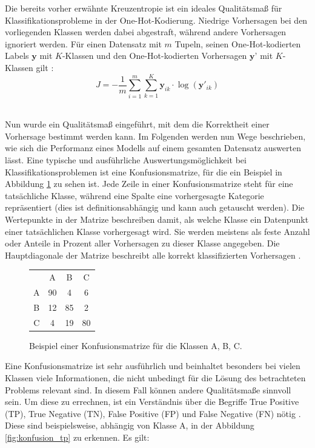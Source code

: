 \documentclass[11pt,bibliography=totocnumbered]{scrartcl}
\newcommand{\myequations}[1]{%
\addcontentsline{equ}{myequations}{\protect\numberline{\theequation}#1}}
\begin{document}
Die bereits vorher erwähnte Kreuzentropie ist ein ideales Qualitätsmaß für Klassifikationsprobleme in der One-Hot-Kodierung. Niedrige Vorhersagen bei den vorliegenden Klassen werden dabei abgestraft, während andere Vorhersagen ignoriert werden. Für einen Datensatz mit \ensuremath{m} Tupeln, seinen One-Hot-kodierten Labels \ensuremath{\textbf{y}} mit \ensuremath{K}-Klassen und den One-Hot-kodierten Vorhersagen \ensuremath{\textbf{y'}} mit \ensuremath{K}-Klassen gilt \cite[S.13]{BA}\cite[S.63]{MACHINE_LEARNING}:
\begin{equation}
\label{eq:crossentropy}
J = -\frac{1}{m}\sum_{i=1}^{m}\sum_{k=1}^{K}\textbf{y}_{ik} \cdot \log({\textbf{y}'_{ik}})
\end{equation}\myequations{Kreuzentropie}
\\
Nun wurde ein Qualitätsmaß eingeführt, mit dem die Korrektheit einer Vorhersage bestimmt werden kann. Im Folgenden werden nun Wege beschrieben, wie sich die Performanz eines Modells auf einem gesamten Datensatz auswerten lässt. Eine typische und ausführliche Auswertungsmöglichkeit bei Klassifikationsproblemen ist eine Konfusionsmatrize, für die ein Beispiel in Abbildung \ref{fig:konfusion} zu sehen ist. Jede Zeile in einer Konfusionsmatrize steht für eine tatsächliche Klasse, während eine Spalte eine vorhergesagte Kategorie repräsentiert (dies ist definitionsabhängig und kann auch getauscht werden). Die Wertepunkte in der Matrize beschreiben damit, als welche Klasse ein Datenpunkt einer tatsächlichen Klasse vorhergesagt wird. Sie werden meistens als feste Anzahl oder Anteile in Prozent aller Vorhersagen zu dieser Klasse angegeben. Die Hauptdiagonale der Matrize beschreibt alle korrekt klassifizierten Vorhersagen \cite[S.86-87]{MACHINE_LEARNING}.
\begin{figure}[H]
	\begin{center}
		\begin{tabular}{|c||c|c|c|}
			\hline
			 & A & B & C\\
			\hhline{|=||=|=|=|}
			A & 90 & 4 & 6\\
			\hline
			B & 12 & 85 & 2\\
			\hline	
			C & 4 & 19 & 80\\
			\hline
		\end{tabular}
	\end{center}
	\caption[Beispiel einer Konfusionsmatrize]{Beispiel einer Konfusionsmatrize für die Klassen A, B, C.}
	\label{fig:konfusion}
\end{figure}
Eine Konfusionsmatrize ist sehr ausführlich und beinhaltet besonders bei vielen Klassen viele Informationen, die nicht unbedingt für die Lösung des betrachteten Problems relevant sind. In diesem Fall können andere Qualitätsmaße sinnvoll sein. Um diese zu errechnen, ist ein Verständnis über die Begriffe True Positive (TP), True Negative (TN), False Positive (FP) und False Negative (FN) nötig \cite[S.87]{MACHINE_LEARNING}. Diese sind beispielsweise, abhängig von Klasse A, in der Abbildung \ref{fig:konfusion_tp} zu erkennen. Es gilt:
\end{document}
